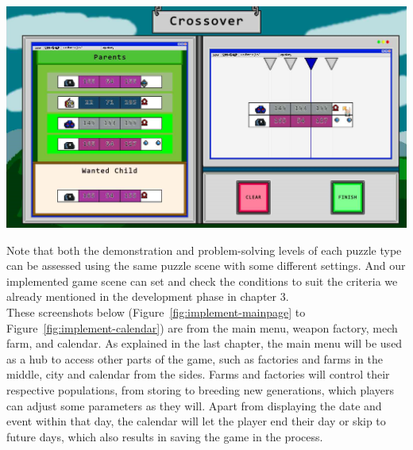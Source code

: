 \documentclass[12pt,oneside,openright,a4paper]{cpe-english-project}
\begin{document}
\pagebreak
\begin{minipage}[c]{\textwidth}\centering
\includegraphics[width=14cm]{figure/implement-puzzle-crossover.png}
\label{fig:implement-puzzle-crossover}
\end{minipage}

Note that both the demonstration and problem-solving levels of each puzzle type can be assessed using the same puzzle scene with some different settings. And our implemented game scene can set and check the conditions to suit the criteria we already mentioned in the development phase in chapter 3.\\
These screenshots below (Figure~\ref{fig:implement-mainpage} to Figure~\ref{fig:implement-calendar}) are from the main menu, weapon factory, mech farm, and calendar. As explained in the last chapter, the main menu will be used as a hub to access other parts of the game, such as factories and farms in the middle, city and calendar from the sides. Farms and factories will control their respective populations, from storing to breeding new generations, which players can adjust some parameters as they will. Apart from displaying the date and event within that day, the calendar will let the player end their day or skip to future days, which also results in saving the game in the process.
\end{document}
